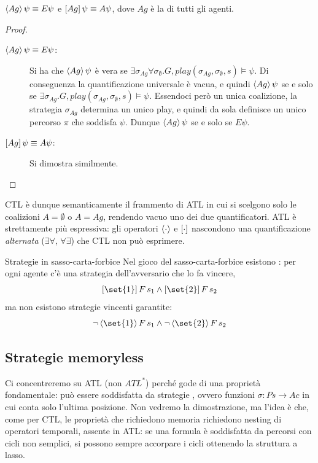 \begin{proposition}{}
  \(\GDia[Ag] \psi\equiv E\psi\) e \(\GBox[Ag] \psi \equiv A\psi\), dove \(Ag\) è la  di tutti gli agenti.
\end{proposition}
\begin{proof}
  \begin{description}
    \item[{\(\GDia[Ag] \psi \equiv E\psi\):}] Si ha che \(\GDia[Ag] \psi\) è vera se \(\exists \sigma_{Ag} \forall \sigma_{\emptyset}.G,play(\sigma_{Ag},\sigma_{\emptyset},s)\models \psi\). Di conseguenza la quantificazione universale è vacua, e quindi \(\GDia[Ag] \psi\) se e solo se \(\exists \sigma_{Ag}.G,play(\sigma_{Ag},\sigma_{\emptyset},s)\models \psi\). Essendoci però un unica coalizione, la strategia \(\sigma_{Ag}\) determina un unico play, e quindi da sola definisce un unico percorso \(\pi\) che soddisfa \(\psi\). Dunque \(\GDia[Ag] \psi\) se e solo se \(E\psi\).
    
    \item[{\(\GBox[Ag] \psi \equiv A\psi\):}] Si dimostra similmente.
  \end{description}
\end{proof}

CTL è dunque semanticamente il frammento di ATL in cui si scelgono solo le coalizioni \(A=\emptyset\) o \(A = Ag\), rendendo vacuo uno dei due quantificatori. ATL è strettamente più espressiva: gli operatori \(\GDia\) e \(\GBox\) nascondono una quantificazione \emph{alternata} (\(\exists\forall\), \(\forall\exists\)) che CTL non può esprimere.

\begin{example}{Strategie in sasso-carta-forbice}
  Nel gioco del sasso-carta-forbice esistono : per ogni agente c'è una strategia dell'avversario che lo fa vincere,
  \[\GBox[\set{1}] F\, s_1\land \GBox[\set{2}] F\, s_2\]
  ma non esistono strategie vincenti garantite:
  \[\neg \GDia[\set{1}] F\, s_1 \land \neg \GDia[\set{2}] F\, s_2\]
\end{example}

\subsection{Strategie memoryless}

Ci concentreremo su ATL (non \(ATL^*\)) perché gode di una proprietà fondamentale: può essere soddisfatta da strategie , ovvero funzioni \(\sigma: Ps\to Ac\) in cui conta solo l'ultima posizione. Non vedremo la dimostrazione, ma l'idea è che, come per CTL, le proprietà che richiedono memoria richiedono nesting di operatori temporali, assente in ATL: se una formula è soddisfatta da percorsi con cicli non semplici, si possono sempre accorpare i cicli ottenendo la struttura a lasso.

